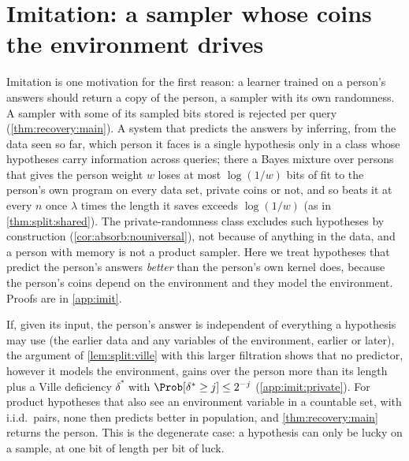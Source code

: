 \section{Imitation: a sampler whose coins the environment drives}\label{sec:imit}

Imitation is one motivation for the first reason: a learner trained on a person's answers should return a copy of the person, a sampler with its own randomness. A sampler with some of its sampled bits stored is rejected per query (\cref{thm:recovery:main}). A system that predicts the answers by inferring, from the data seen so far, which person it faces is a single hypothesis only in a class whose hypotheses carry information across queries; there a Bayes mixture over persons that gives the person weight $w$ loses at most $\log(1/w)$ bits of fit to the person's own program on every data set, private coins or not, and so beats it at every $n$ once $\lambda$ times the length it saves exceeds $\log(1/w)$ (as in \cref{thm:split:shared}). The private-randomness class excludes such hypotheses by construction (\cref{cor:absorb:nouniversal}), not because of anything in the data, and a person with memory is not a product sampler. Here we treat hypotheses that predict the person's answers \emph{better} than the person's own kernel does, because the person's coins depend on the environment and they model the environment. Proofs are in \cref{app:imit}.

\begin{remark}\label{rem:imit:private}
If, given its input, the person's answer is independent of everything a hypothesis may use (the earlier data and any variables of the environment, earlier or later), the argument of \cref{lem:split:ville} with this larger filtration shows that no predictor, however it models the environment, gains over the person more than its length plus a Ville deficiency $\delta^*$ with $\Prob[\delta^*\ge j]\le2^{-j}$ (\cref{app:imit:private}). For product hypotheses that also see an environment variable in a countable set, with i.i.d.\ pairs, none then predicts better in population, and \cref{thm:recovery:main} returns the person. This is the degenerate case: a hypothesis can only be lucky on a sample, at one bit of length per bit of luck.
\end{remark}

